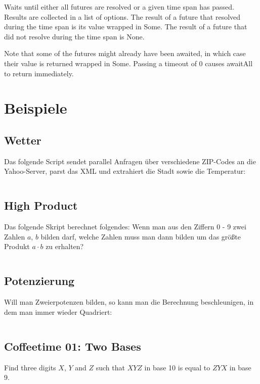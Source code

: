 Waits until either all futures are resolved or a given time span has passed. Results are collected in a list of options. The result of a future that resolved during the time span is its value wrapped in Some. The result of a future that did not resolve during the time span is None.

Note that some of the futures might already have been awaited, in which case their value is returned wrapped in Some. Passing a timeout of 0 causes awaitAll to return immediately.


\section{Beispiele}
\subsection{Wetter}
Das folgende Script sendet parallel Anfragen über verschiedene ZIP-Codes an
die Yahoo-Server, parst das XML und extrahiert die Stadt sowie die Temperatur:

\inputminted[linenos, numbersep=5pt, tabsize=4, frame=lines, label=weather.scala]{scala}{scripts/scala/weather.scala}

\subsection{High Product}
Das folgende Skript berechnet folgendes: Wenn man aus den Ziffern 0 - 9 zwei
Zahlen $a$, $b$ bilden darf, welche Zahlen muss man dann bilden um das größte Produkt
$a \cdot b$ zu erhalten?

\inputminted[linenos, numbersep=5pt, tabsize=4, frame=lines, label=main.scala]{scala}{scripts/scala/HighProduct.scala}

\subsection{Potenzierung}
Will man Zweierpotenzen bilden, so kann man die Berechnung beschleunigen, in dem
man immer wieder Quadriert:

\inputminted[linenos, numbersep=5pt, tabsize=4, frame=lines, label=power-futures.scala]{scala}{scripts/scala/power-futures.scala}

\subsection{Coffeetime 01: Two Bases}
Find three digits $X$, $Y$ and $Z$ such that $XYZ$ in base 10 is equal to $ZYX$
in base 9.

